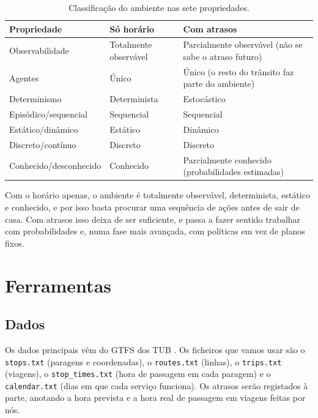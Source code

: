 \documentclass[11pt,a4paper]{article}
\begin{document}
\begin{table}[H]
\centering
\begin{tabularx}{\textwidth}{@{}l L L@{}}
\toprule
\textbf{Propriedade} & \textbf{Só horário} & \textbf{Com atrasos} \\
\midrule
Observabilidade        & Totalmente observável & Parcialmente observável (não se sabe o atraso futuro) \\
Agentes                & Único & Único (o resto do trânsito faz parte do ambiente) \\
Determinismo           & Determinista & Estocástico \\
Episódico/sequencial   & Sequencial & Sequencial \\
Estático/dinâmico      & Estático & Dinâmico \\
Discreto/contínuo      & Discreto & Discreto \\
Conhecido/desconhecido & Conhecido & Parcialmente conhecido (probabilidades estimadas) \\
\bottomrule
\end{tabularx}
\caption{Classificação do ambiente nas sete propriedades.}
\end{table}

Com o horário apenas, o ambiente é totalmente observável, determinista,
estático e conhecido, e por isso basta procurar uma sequência de ações
antes de sair de casa. Com atrasos isso deixa de ser suficiente, e
passa a fazer sentido trabalhar com probabilidades e, numa fase mais
avançada, com políticas em vez de planos fixos.

\section{Ferramentas}
\label{sec:ferramentas}

\subsection{Dados}

Os dados principais vêm do GTFS dos TUB \cite{tubgtfs}. Os ficheiros que
vamos usar são o \texttt{stops.txt} (paragens e coordenadas), o
\texttt{routes.txt} (linhas), o \texttt{trips.txt} (viagens), o
\texttt{stop\_times.txt} (hora de passagem em cada paragem) e o
\texttt{calendar.txt} (dias em que cada serviço funciona). Os atrasos
serão registados à parte, anotando a hora prevista e a hora real de
passagem em viagens feitas por nós.
\end{document}
